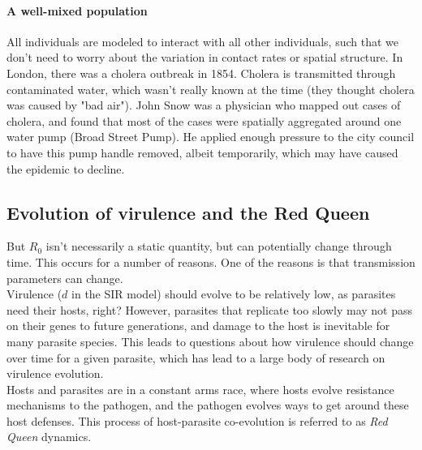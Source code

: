 \documentclass[12pt]{article}
\begin{document}
\paragraph*{A well-mixed population}

All individuals are modeled to interact with all other individuals, such that we don't need to worry about the variation in contact rates or spatial structure. In London, there was a cholera outbreak in 1854. Cholera is transmitted through contaminated water, which wasn't really known at the time (they thought cholera was caused by "bad air"). John Snow was a physician who mapped out cases of cholera, and found that most of the cases were spatially aggregated around one water pump (Broad Street Pump). He applied enough pressure to the city council to have this pump handle removed, albeit temporarily, which may have caused the epidemic to decline. 

















\bigskip

\subsection*{Evolution of virulence and the Red Queen}

But $R_0$ isn't necessarily a static quantity, but can potentially change through time. This occurs for a number of reasons. One of the reasons is that transmission parameters can change. \\



Virulence ($d$ in the SIR model) should evolve to be relatively low, as parasites need their hosts, right? However, parasites that replicate too slowly may not pass on their genes to future generations, and damage to the host is inevitable for many parasite species. This leads to questions about how virulence should change over time for a given parasite, which has lead to a large body of research on virulence evolution.   \\



Hosts and parasites are in a constant arms race, where hosts evolve resistance mechanisms to the pathogen, and the pathogen evolves ways to get around these host defenses. This process of host-parasite co-evolution is referred to as \textit{Red Queen} dynamics. \\
\end{document}
